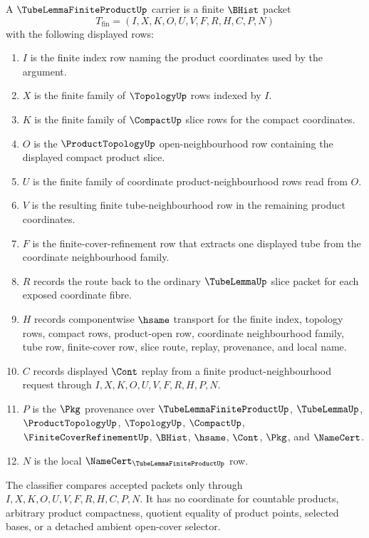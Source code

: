 \begin{definition}
\label{def:tube-lemma-finite-product-carrier}
A $\TubeLemmaFiniteProductUp$ carrier is a finite $\BHist$ packet
$$
T_{\mathrm{fin}}=(I,X,K,O,U,V,F,R,H,C,P,N)
$$
with the following displayed rows:
\begin{enumerate}
\item $I$ is the finite index row naming the product coordinates used by the argument.
\item $X$ is the finite family of $\TopologyUp$ rows indexed by $I$.
\item $K$ is the finite family of $\CompactUp$ slice rows for the compact coordinates.
\item $O$ is the $\ProductTopologyUp$ open-neighbourhood row containing the displayed compact product slice.
\item $U$ is the finite family of coordinate product-neighbourhood rows read from $O$.
\item $V$ is the resulting finite tube-neighbourhood row in the remaining product coordinates.
\item $F$ is the finite-cover-refinement row that extracts one displayed tube from the coordinate neighbourhood family.
\item $R$ records the route back to the ordinary $\TubeLemmaUp$ slice packet for each exposed coordinate fibre.
\item $H$ records componentwise $\hsame$ transport for the finite index, topology rows, compact rows, product-open row, coordinate neighbourhood family, tube row, finite-cover row, slice route, replay, provenance, and local name.
\item $C$ records displayed $\Cont$ replay from a finite product-neighbourhood request through $I,X,K,O,U,V,F,R,H,P,N$.
\item $P$ is the $\Pkg$ provenance over $\TubeLemmaFiniteProductUp$, $\TubeLemmaUp$, $\ProductTopologyUp$, $\TopologyUp$, $\CompactUp$, $\FiniteCoverRefinementUp$, $\BHist$, $\hsame$, $\Cont$, $\Pkg$, and $\NameCert$.
\item $N$ is the local $\NameCert_{\TubeLemmaFiniteProductUp}$ row.
\end{enumerate}
The classifier compares accepted packets only through $I,X,K,O,U,V,F,R,H,C,P,N$. It has no coordinate for countable products, arbitrary product compactness, quotient equality of product points, selected bases, or a detached ambient open-cover selector.
\end{definition}

